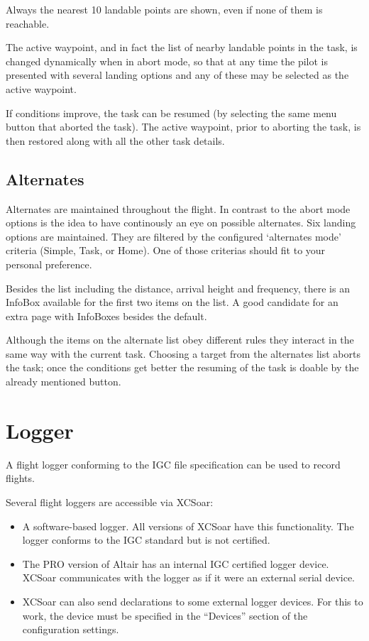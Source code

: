 Always the nearest 10 landable points are shown, even if none 
of them is reachable.

The active waypoint, and in fact the list of nearby landable points in
the task, is changed dynamically when in abort mode, so that at any
time the pilot is presented with several landing options and any of
these may be selected as the active waypoint.

If conditions improve, the task can be resumed (by selecting the same
menu button that aborted the task).  The active waypoint, prior to
aborting the task, is then restored along with all the other task
details.

\subsection*{Alternates}
Alternates are maintained throughout the flight. In contrast to the abort mode 
options is the idea to have continously an eye on possible alternates. Six landing 
options are maintained. They are filtered by the configured `alternates mode' 
criteria (Simple, Task, or Home).  
One of those criterias should fit to your personal preference. 

Besides the list including the distance, arrival height and frequency, there 
is an InfoBox available for the first two items on the list. A good candidate 
for an extra page with InfoBoxes besides the default.

Although the items on the alternate list obey different rules they interact 
in the same way 
with the current task. Choosing a target from the alternates list aborts the task; 
once the conditions get better the resuming of the task is doable by the already 
mentioned button.


\section{Logger}

A flight logger conforming to the IGC file specification can be used
to record flights.  

Several flight loggers are accessible via XCSoar:
\begin{itemize}
\item A software-based logger.  All versions of XCSoar have this
  functionality.  The logger conforms to the IGC standard but is not
  certified.
\item The PRO version of Altair has an internal IGC certified logger device.
  XCSoar communicates with the logger as if it were an external serial device.

\item XCSoar can also send declarations to some external logger devices. 
For this to work, the device must be specified in the ``Devices'' 
section of the configuration  settings.
\end{itemize}

